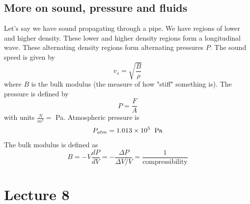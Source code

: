 \documentclass{report}
\numberwithin{equation}{section}
\begin{document}
\subsection{More on sound, pressure and fluids}
Let's say we have sound propagating through a pipe. We have regions of lower and higher density. These lower and higher density regions form a longitudinal wave. These alternating density regions form alternating pressures $P$. The sound speed is given by
\begin{equation}
	v_s = \sqrt{\frac{B}{\rho}}
\end{equation}
where $B$ is the bulk modulus (the measure of how "stiff" something is). The pressure is defined by
\begin{equation}
	P = \frac{F}{A}
\end{equation}
with units $\frac{N}{m^2} = $ Pa. Atmospheric pressure is
\begin{equation}
	P_{atm} = 1.013\times 10^5 \hspace{0.2cm}\text{Pa}
\end{equation}
The bulk modulus is defined as
\begin{equation}
	B = -V\frac{dP}{dV}  = -\frac{\Delta P}{\Delta V/V} = \frac{1}{\text{compressibility}}
\end{equation}
\section{Lecture 8}
\end{document}
